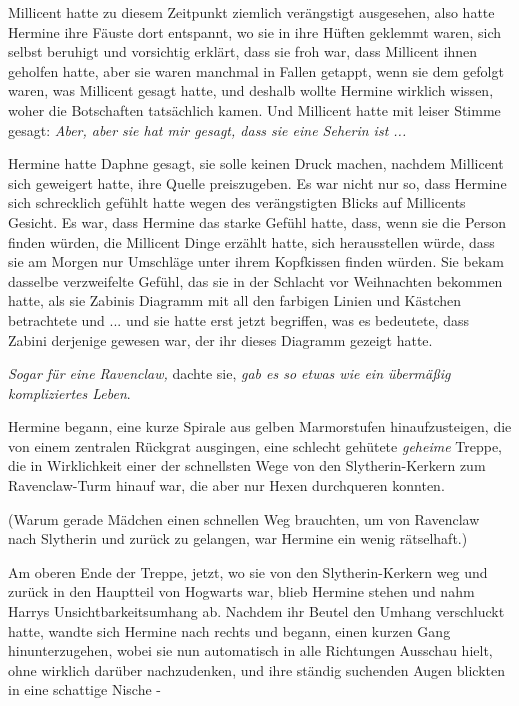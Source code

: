 Millicent hatte zu diesem Zeitpunkt ziemlich verängstigt ausgesehen, also hatte
Hermine ihre Fäuste dort entspannt, wo sie in ihre Hüften geklemmt waren, sich
selbst beruhigt und vorsichtig erklärt, dass sie froh war, dass Millicent ihnen
geholfen hatte, aber sie waren manchmal in Fallen getappt, wenn sie dem gefolgt
waren, was Millicent gesagt hatte, und deshalb wollte Hermine wirklich wissen,
woher die Botschaften tatsächlich kamen. Und Millicent hatte mit leiser Stimme
gesagt: \emph{Aber, aber sie hat mir gesagt, dass sie eine Seherin ist ...}

Hermine hatte Daphne gesagt, sie solle keinen Druck machen, nachdem Millicent
sich geweigert hatte, ihre Quelle preiszugeben. Es war nicht nur so, dass
Hermine sich schrecklich gefühlt hatte wegen des verängstigten Blicks auf
Millicents Gesicht. Es war, dass Hermine das starke Gefühl hatte, dass, wenn sie
die Person finden würden, die Millicent Dinge erzählt hatte, sich herausstellen
würde, dass sie am Morgen nur Umschläge unter ihrem Kopfkissen finden würden.
Sie bekam dasselbe verzweifelte Gefühl, das sie in der Schlacht vor Weihnachten
bekommen hatte, als sie Zabinis Diagramm mit all den farbigen Linien und
Kästchen betrachtete und ... und sie hatte erst jetzt begriffen, was es
bedeutete, dass Zabini derjenige gewesen war, der ihr dieses Diagramm gezeigt
hatte.

\emph{Sogar für eine Ravenclaw,} dachte sie, \emph{gab es so etwas wie ein
übermäßig kompliziertes Leben}.

Hermine begann, eine kurze Spirale aus gelben Marmorstufen hinaufzusteigen, die
von einem zentralen Rückgrat ausgingen, eine schlecht gehütete \glqq{}
\emph{geheime}\grqq{} Treppe, die in Wirklichkeit einer der schnellsten Wege von
den Slytherin-Kerkern zum Ravenclaw-Turm hinauf war, die aber nur Hexen
durchqueren konnten.

(Warum gerade Mädchen einen schnellen Weg brauchten, um von Ravenclaw nach
Slytherin und zurück zu gelangen, war Hermine ein wenig rätselhaft.)

Am oberen Ende der Treppe, jetzt, wo sie von den Slytherin-Kerkern weg und
zurück in den Hauptteil von Hogwarts war, blieb Hermine stehen und nahm Harrys
Unsichtbarkeitsumhang ab. Nachdem ihr Beutel den Umhang verschluckt hatte,
wandte sich Hermine nach rechts und begann, einen kurzen Gang hinunterzugehen,
wobei sie nun automatisch in alle Richtungen Ausschau hielt, ohne wirklich
darüber nachzudenken, und ihre ständig suchenden Augen blickten in eine
schattige Nische -

